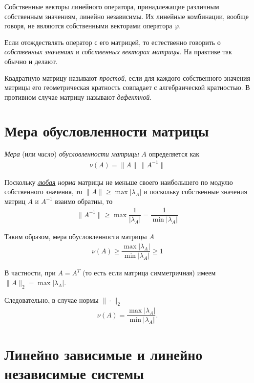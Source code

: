 \documentclass[%
	11pt,
	a4paper,
	utf8,
		]{article}
\begin{document}
Собственные векторы линейного оператора, принадлежащие различным собственным значениям, линейно независимы. Их линейные комбинации, вообще говоря, не являются собственными векторами оператора $ \varphi $.

Если отождествлять оператор с его матрицей, то естественно говорить о \emph{собственных значениях} и \emph{собственных векторах матрицы}. На практике так обычно и делают.

Квадратную матрицу называют \emph{простой}, если для каждого собственного значения матрицы его геометрическая кратность совпадает с алгебраической кратностью. В противном случае матрицу называют \emph{дефектной}.





\section{Мера обусловленности матрицы}

\emph{Мера} (или \emph{число}) \emph{обусловленности матрицы} $ A $ определяется как \cite[]{bahvalov:num_methods}
\begin{align*}
	\nu(A) = \| A \| \, \| A^{-1} \|
\end{align*}
 
Поскольку \emph{\underline{любая} норма} матрицы не меньше своего наибольшего по модулю собственного значения, то $ \| A \| \geqslant \max | \lambda_A | $ и поскольку собственные значения матриц $ A $ и $ A^{-1} $ взаимо обратны, то
\begin{align*}
	\| A^{-1} \| \geqslant \max \dfrac{1}{ | \lambda_A | } = \dfrac{1}{ \min | \lambda_A | }
\end{align*}

Таким образом, мера обусловленности матрицы $ A $
\begin{align*}
	\boxed{\nu(A) \geqslant \dfrac{\max | \lambda_A |}{ \min | \lambda_A | } \geqslant 1}
\end{align*}

В частности, при $ A = A^T $ (то есть если матрица симметричная) имеем $ \| A \|_2 = \max | \lambda_A | $.

Следовательно, в случае нормы $ \| \cdot \|_2 $
\begin{align*}
	\nu(A) = \dfrac{ \max | \lambda_A | }{ \min | \lambda_A | }.
\end{align*}


\section{Линейно зависимые и линейно независимые системы}
\end{document}
